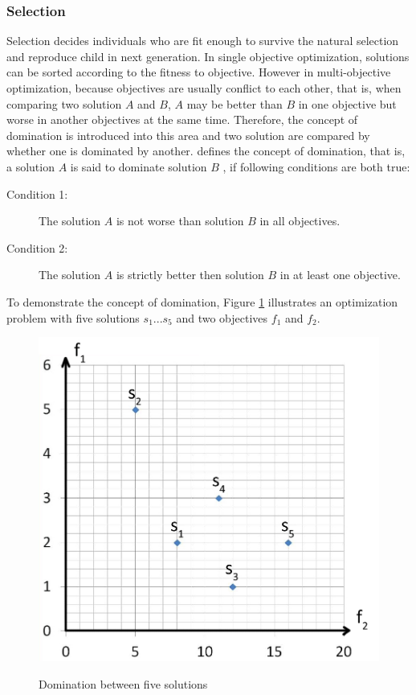 \subsubsection{Selection}

Selection decides individuals who are fit enough to survive the natural selection and reproduce child in next generation. In single objective optimization, solutions can be sorted according to the fitness to objective. However in multi-objective optimization, because objectives are usually conflict to each other, that is, when comparing two solution $A$ and $B$, $A$ may be better than $B$ in one objective but worse in another objectives at the same time. Therefore, the concept of domination is introduced into this area and two solution are compared by whether one is dominated by another.  defines the concept of domination, that is, a solution $A$ is said to dominate solution $B$ , if following conditions are both true:

\begin{description}
  \item[Condition 1: ] The solution $A$ is not worse than solution $B$ in all objectives.  
  \item[Condition 2: ] The solution $A$ is strictly better then solution $B$ in at least one objective. 
\end{description}

To demonstrate the concept of domination, Figure \ref{figure::domination} illustrates an optimization problem with five solutions $s_{1}...s_{5}$ and two objectives $f_{1}$ and $f_{2}$.

\begin{figure}[H]
	\centering
	\includegraphics[width=0.9\columnwidth]{../images/domination}\\[0.1cm]
    \caption{Domination between five solutions}
    \label{figure::domination}
\end{figure}

